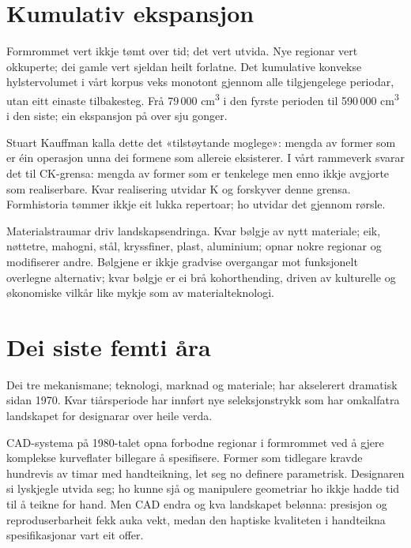 \section*{Kumulativ ekspansjon}


Formrommet vert ikkje tømt over tid; det vert utvida. Nye regionar vert okkuperte; dei gamle vert sjeldan heilt forlatne. Det kumulative konvekse hylstervolumet i vårt korpus veks monotont gjennom alle tilgjengelege periodar, utan eitt einaste tilbakesteg. Frå 79\,000 cm\textsuperscript{3} i den fyrste perioden til 590\,000 cm\textsuperscript{3} i den siste; ein ekspansjon på over sju gonger.

Stuart Kauffman kalla dette det «tilstøytande moglege»: mengda av former som er éin operasjon unna dei formene som allereie eksisterer. I vårt rammeverk svarar det til CK-grensa: mengda av former som er tenkelege men enno ikkje avgjorte som realiserbare. Kvar realisering utvidar K og forskyver denne grensa. Formhistoria tømmer ikkje eit lukka repertoar; ho utvidar det gjennom rørsle.

Materialstraumar driv landskapsendringa. Kvar bølgje av nytt materiale; eik, nøttetre, mahogni, stål, kryssfiner, plast, aluminium; opnar nokre regionar og modifiserer andre. Bølgjene er ikkje gradvise overgangar mot funksjonelt overlegne alternativ; kvar bølgje er ei brå kohorthending, driven av kulturelle og økonomiske vilkår like mykje som av materialteknologi.

\section*{Dei siste femti åra}

Dei tre mekanismane; teknologi, marknad og materiale; har akselerert dramatisk sidan 1970. Kvar tiårsperiode har innført nye seleksjonstrykk som har omkalfatra landskapet for designarar over heile verda.

CAD-systema på 1980-talet opna forbodne regionar i formrommet ved å gjere komplekse kurveflater billegare å spesifisere. Former som tidlegare kravde hundrevis av timar med handteikning, let seg no definere parametrisk. Designaren si lyskjegle utvida seg; ho kunne sjå og manipulere geometriar ho ikkje hadde tid til å teikne for hand. Men CAD endra og kva landskapet belønna: presisjon og reproduserbarheit fekk auka vekt, medan den haptiske kvaliteten i handteikna spesifikasjonar vart eit offer.

